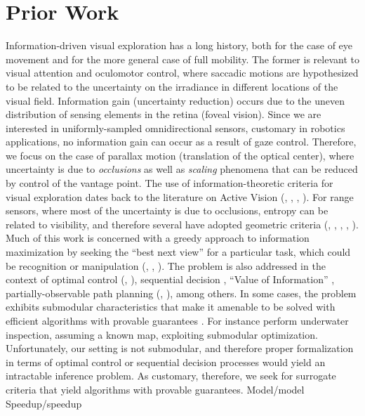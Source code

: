 \section{Prior Work}
Information-driven visual exploration has a long history, both for the case of eye movement and for the more general case of full mobility. The former is relevant to visual attention and oculomotor control, 
where saccadic motions are hypothesized to be related to the uncertainty on the irradiance in different locations of the visual field. Information gain (uncertainty reduction) occurs due to the uneven distribution
of sensing elements in the retina (foveal vision). Since we are interested in uniformly-sampled omnidirectional sensors, customary in robotics applications, no information gain can occur as a result of gaze control. 
Therefore, we focus on the case of parallax motion (translation of the optical center), where uncertainty is due to {\em occlusions} as well as {\em scaling} phenomena that can be reduced by control of the vantage point.
The use of information-theoretic criteria for visual exploration dates back to the literature on Active Vision (\cite{whaiteF97}, \cite{arbelF01}, \cite{yuG00}, \cite{burnsB03}). For range sensors, 
where most of the uncertainty is due to occlusions, entropy can be related to visibility, and therefore several have adopted geometric criteria (\cite{connolly85}, \cite{yuWY96}, \cite{yamauchi97}, \cite{grabowskiKC03}, 
\cite{valenteTS12}). Much of this work is concerned with a greedy approach to information maximization by seeking the ``best next view'' for a particular task, which could be recognition or manipulation (\cite{grabowskiKC03}, 
\cite{denzlerB02}, \cite{royCB04}).
The problem is also addressed in the context of optimal control (\cite{cassandraKL94}, \cite{SimD04}), sequential decision \cite{algoet94}, ``Value of Information'' \cite{dearden99}, 
partially-observable path planning (\cite{hauskrecht00}, \cite{kearnsMN99}), among others. In some cases, the problem exhibits submodular characteristics that make it amenable to be solved with
efficient algorithms with provable guarantees \cite{krauseG07}. For instance \cite{hollinger12} perform underwater inspection, assuming a known map, exploiting submodular optimization. Unfortunately, 
our setting is not submodular, and therefore proper formalization in terms of optimal control or sequential decision processes would yield an intractable inference problem. As customary, therefore, we seek for 
surrogate criteria that yield algorithms with provable guarantees.
% 
{Model/model}
{Speedup/speedup}
